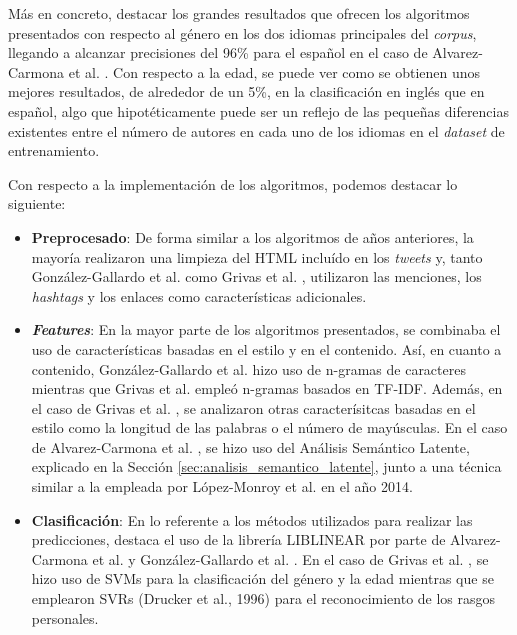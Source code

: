 \bigskip
Más en concreto, destacar los grandes resultados que
ofrecen los algoritmos presentados con respecto al género en los dos idiomas principales del \textit{corpus}, llegando a alcanzar
precisiones del 96\% para el español en el caso de Alvarez-Carmona et al. \cite{alvarez2015inaoe}. Con respecto a la edad,
se puede ver como se obtienen unos mejores resultados, de alrededor de un 5\%, en la clasificación en inglés que en español, algo que
hipotéticamente puede ser un reflejo de las pequeñas diferencias existentes entre el número de autores en cada uno de los idiomas en
el \textit{dataset} de entrenamiento.

\bigskip
Con respecto a la implementación de los algoritmos, podemos destacar lo siguiente:

\begin{itemize}
	\item \textbf{Preprocesado}: De forma similar a los algoritmos de años anteriores, la mayoría realizaron una limpieza del HTML incluído
	en los \textit{tweets} y, tanto González-Gallardo et al. \cite{gonzalez2015tweets} como Grivas et al. \cite{grivas2015author}, utilizaron
	las menciones, los \textit{hashtags} y los enlaces como características adicionales.
	\item \textbf{\textit{Features}}: En la mayor parte de los algoritmos presentados, se combinaba el uso de características
	basadas en el estilo y en el contenido. Así, en cuanto a contenido, González-Gallardo et al. \cite{gonzalez2015tweets} hizo uso de n-gramas de caracteres
	mientras que Grivas et al. \cite{grivas2015author} empleó n-gramas basados en TF-IDF. Además, en el caso de Grivas et al. \cite{grivas2015author},
	se analizaron otras caracterísitcas basadas en el estilo como la longitud de las palabras o el número de mayúsculas. En el caso de Alvarez-Carmona et al. \cite{alvarez2015inaoe},
	se hizo uso del Análisis Semántico Latente, explicado en la Sección \ref{sec:analisis_semantico_latente}, junto a una técnica similar a la empleada por
	López-Monroy et al. \cite{lopez2014using} en el año 2014.
	\item \textbf{Clasificación}: En lo referente a los métodos utilizados para realizar las predicciones, destaca el uso de la librería LIBLINEAR \cite{fan2008liblinear}
	por parte de Alvarez-Carmona et al. \cite{alvarez2015inaoe} y González-Gallardo et al. \cite{gonzalez2015tweets}. En el caso de Grivas et al. \cite{grivas2015author}, se hizo
	uso de SVMs para la clasificación del género y la edad mientras que se emplearon SVRs (Drucker et al., 1996) \cite{drucker1996support} para el reconocimiento de los rasgos personales.
\end{itemize}

